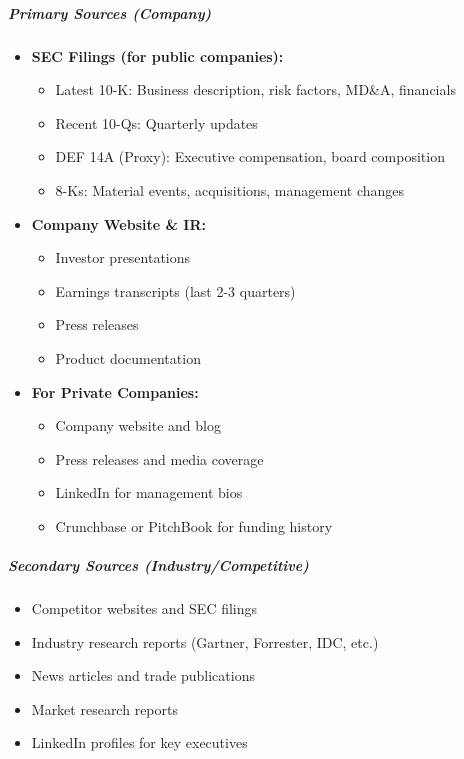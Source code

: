 \documentclass[11pt]{article}
\begin{document}
\subparagraph{Primary Sources (Company)}\mbox{}\par
\begin{itemize}[leftmargin=*,itemsep=2pt,topsep=2pt]
\item {} \textbf{SEC Filings (for public companies):}
\begin{itemize}[leftmargin=*,itemsep=2pt,topsep=2pt]
\item {} Latest 10-K: Business description, risk factors, MD\&A, financials
\item {} Recent 10-Qs: Quarterly updates
\item {} DEF 14A (Proxy): Executive compensation, board composition
\item {} 8-Ks: Material events, acquisitions, management changes
\end{itemize}
\item {} \textbf{Company Website \& IR:}
\begin{itemize}[leftmargin=*,itemsep=2pt,topsep=2pt]
\item {} Investor presentations
\item {} Earnings transcripts (last 2-3 quarters)
\item {} Press releases
\item {} Product documentation
\end{itemize}
\item {} \textbf{For Private Companies:}
\begin{itemize}[leftmargin=*,itemsep=2pt,topsep=2pt]
\item {} Company website and blog
\item {} Press releases and media coverage
\item {} LinkedIn for management bios
\item {} Crunchbase or PitchBook for funding history
\end{itemize}
\end{itemize}

\subparagraph{Secondary Sources (Industry/Competitive)}\mbox{}\par
\begin{itemize}[leftmargin=*,itemsep=2pt,topsep=2pt]
\item {} Competitor websites and SEC filings
\item {} Industry research reports (Gartner, Forrester, IDC, etc.)
\item {} News articles and trade publications
\item {} Market research reports
\item {} LinkedIn profiles for key executives
\end{itemize}
\end{document}
